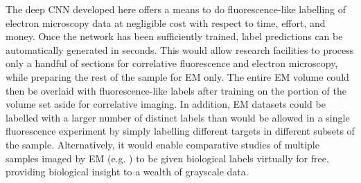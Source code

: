 The deep CNN developed here offers a means to do fluorescence-like labelling of electron microscopy data at negligible cost with respect to time, effort, and money. Once the network has been sufficiently trained, label predictions can be automatically generated in seconds. This would allow research facilities to process only a handful of sections for correlative fluorescence and electron microscopy, while preparing the rest of the sample for EM only. The entire EM volume could then be overlaid with fluorescence-like labels after training on the portion of the volume set aside for correlative imaging. In addition, EM datasets could be labelled with a larger number of distinct labels than would be allowed in a single fluorescence experiment by simply labelling different targets in different subsets of the sample.  Alternatively, it would enable comparative studies of multiple samples imaged by EM (e.g. \cite{sokol2015large, de2020large}) to be given biological labels virtually for free, providing biological insight to a wealth of grayscale data. 
